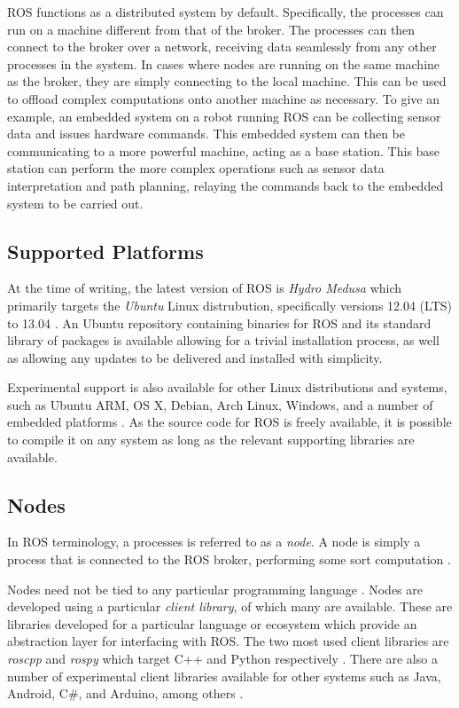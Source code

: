 ROS functions as a distributed system by default. Specifically, the processes can run on a machine different from that of the broker. The processes can then connect to the broker over a network, receiving data seamlessly from any other processes in the system. In cases where nodes are running on the same machine as the broker, they are simply connecting to the local machine. This can be used to offload complex computations onto another machine as necessary. To give an example, an embedded system on a robot running ROS can be collecting sensor data and issues hardware commands. This embedded system can then be communicating to a more powerful machine, acting as a base station. This base station can perform the more complex operations such as sensor data interpretation and path planning, relaying the commands back to the embedded system to be carried out.

\subsection{Supported Platforms}
At the time of writing, the latest version of ROS is \emph{Hydro Medusa} which primarily targets the \emph{Ubuntu} Linux distrubution, specifically versions 12.04 (LTS) to 13.04 \cite{ros_wiki_installation, ros_wiki_installation_ubuntu}. An Ubuntu repository containing binaries for ROS and its standard library of packages is available allowing for a trivial installation process, as well as allowing any updates to be delivered and installed with simplicity.

Experimental support is also available for other Linux distributions and systems, such as Ubuntu ARM, OS X, Debian, Arch Linux, Windows, and a number of embedded platforms \cite{ros_wiki_installation}. As the source code for ROS is freely available, it is possible to compile it on any system as long as the relevant supporting libraries are available.

\subsection{Nodes}
In ROS terminology, a processes is referred to as a \emph{node}. A node is simply a process that is connected to the ROS broker, performing some sort computation \cite{ros_paper}.

Nodes need not be tied to any particular programming language \cite{ros_paper}. Nodes are developed using a particular \emph{client library}, of which many are available. These are libraries developed for a particular language or ecosystem which provide an abstraction layer for interfacing with ROS. The two most used client libraries are \emph{roscpp} and \emph{rospy} which target C++ and Python respectively \cite{ros_wiki_clientlibraries}. There are also a number of experimental client libraries available for other systems such as Java, Android, C\#, and Arduino, among others \cite{ros_wiki_clientlibraries}.


